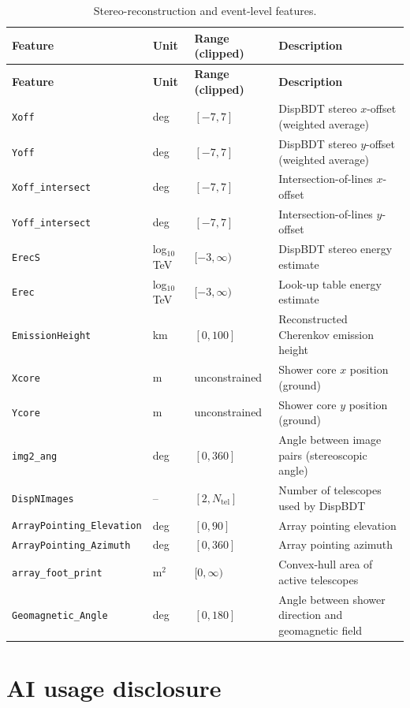 \documentclass[12pt]{article}
\begin{document}
\begin{longtable}{lll p{5.5cm}}
\caption{Stereo-reconstruction and event-level features.} \label{tab:features-stereo} \\
\hline
\textbf{Feature} & \textbf{Unit} & \textbf{Range (clipped)} & \textbf{Description} \\
\hline
\endfirsthead
\hline
\textbf{Feature} & \textbf{Unit} & \textbf{Range (clipped)} & \textbf{Description} \\
\hline
\endhead
\hline
\endfoot
\texttt{Xoff} & deg & $[-7,7]$ & DispBDT stereo $x$-offset (weighted average) \\
\texttt{Yoff} & deg & $[-7,7]$ & DispBDT stereo $y$-offset (weighted average) \\
\texttt{Xoff\_intersect} & deg & $[-7,7]$ & Intersection-of-lines $x$-offset \\
\texttt{Yoff\_intersect} & deg & $[-7,7]$ & Intersection-of-lines $y$-offset \\
\texttt{ErecS} & log$_{10}$ TeV & $[-3,\infty)$ & DispBDT stereo energy estimate \\
\texttt{Erec} & log$_{10}$ TeV & $[-3,\infty)$ & Look-up table energy estimate \\
\texttt{EmissionHeight} & km & $[0,100]$ & Reconstructed Cherenkov emission height \\
\texttt{Xcore} & m & unconstrained & Shower core $x$ position (ground) \\
\texttt{Ycore} & m & unconstrained & Shower core $y$ position (ground) \\
\texttt{img2\_ang} & deg & $[0,360]$ & Angle between image pairs (stereoscopic angle) \\
\texttt{DispNImages} & -- & $[2, N_\mathrm{tel}]$ & Number of telescopes used by DispBDT \\
\texttt{ArrayPointing\_Elevation} & deg & $[0,90]$ & Array pointing elevation \\
\texttt{ArrayPointing\_Azimuth} & deg & $[0,360]$ & Array pointing azimuth \\
\texttt{array\_foot\_print} & m$^2$ & $[0,\infty)$ & Convex-hull area of active telescopes \\
\texttt{Geomagnetic\_Angle} & deg & $[0,180]$ & Angle between shower direction and geomagnetic field \\
\end{longtable}

\section*{AI usage disclosure}
\end{document}
